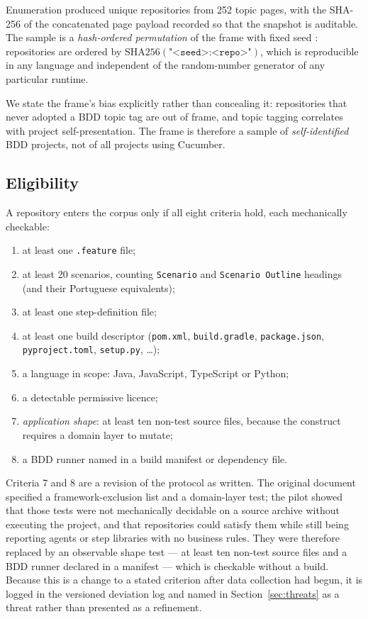 Enumeration produced \Nframe{} unique repositories from 252 topic pages, with the SHA-256 of the
concatenated page payload recorded so that the snapshot is auditable. The sample is a
\emph{hash-ordered permutation} of the frame with fixed seed \Seed{}: repositories are ordered by
$\mathrm{SHA256}(\texttt{"<seed>:<repo>"})$, which is reproducible in any language and independent of
the random-number generator of any particular runtime.

We state the frame's bias explicitly rather than concealing it: repositories that never adopted a BDD
topic tag are out of frame, and topic tagging correlates with project self-presentation. The frame is
therefore a sample of \emph{self-identified} BDD projects, not of all projects using Cucumber.

\subsection{Eligibility}

A repository enters the corpus only if all eight criteria hold, each mechanically checkable:

\begin{enumerate}
\item at least one \texttt{.feature} file;
\item at least 20 scenarios, counting \texttt{Scenario} and \texttt{Scenario Outline} headings (and
      their Portuguese equivalents);
\item at least one step-definition file;
\item at least one build descriptor (\texttt{pom.xml}, \texttt{build.gradle}, \texttt{package.json},
      \texttt{pyproject.toml}, \texttt{setup.py}, \ldots);
\item a language in scope: Java, JavaScript, TypeScript or Python;
\item a detectable permissive licence;
\item \emph{application shape}: at least ten non-test source files, because the construct requires a
      domain layer to mutate;
\item a BDD runner named in a build manifest or dependency file.
\end{enumerate}

Criteria 7 and 8 are a revision of the protocol as written. The original document specified a
framework-exclusion list and a domain-layer test; the pilot showed that those tests were not
mechanically decidable on a source archive without executing the project, and that repositories could
satisfy them while still being reporting agents or step libraries with no business rules. They were
therefore replaced by an observable shape test --- at least ten non-test source files and a BDD runner
declared in a manifest --- which is checkable without a build. Because this is a change to a stated
criterion after data collection had begun, it is logged in the versioned deviation log and named in
Section~\ref{sec:threats} as a threat rather than presented as a refinement.

